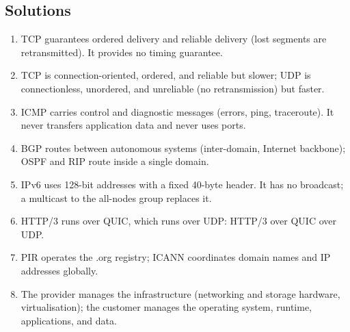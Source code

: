 \documentclass[11pt]{article}
\begin{document}
\subsection*{Solutions}
\begingroup\small
\begin{enumerate}[label=\arabic*.]
  \item TCP guarantees ordered delivery and reliable delivery (lost segments
    are retransmitted). It provides no timing guarantee.
  \item TCP is connection-oriented, ordered, and reliable but slower; UDP is
    connectionless, unordered, and unreliable (no retransmission) but faster.
  \item ICMP carries control and diagnostic messages (errors, ping,
    traceroute). It never transfers application data and never uses ports.
  \item BGP routes between autonomous systems (inter-domain, Internet
    backbone); OSPF and RIP route inside a single domain.
  \item IPv6 uses 128-bit addresses with a fixed 40-byte header. It has no
    broadcast; a multicast to the all-nodes group replaces it.
  \item HTTP/3 runs over QUIC, which runs over UDP: HTTP/3 over QUIC over
    UDP.
  \item PIR operates the .org registry; ICANN coordinates domain names and
    IP addresses globally.
  \item The provider manages the infrastructure (networking and storage
    hardware, virtualisation); the customer manages the operating system,
    runtime, applications, and data.
\end{enumerate}
\endgroup
\end{document}
